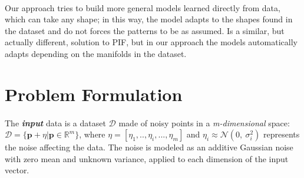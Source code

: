 \paragraph{}
Our approach tries to build more general models learned directly from data, which can take any shape; in this way, the model adapts to the shapes found in the dataset and do not forces the patterns to be as assumed. Is a similar, but actually different, solution to PIF, but in our approach the models automatically adapts depending on the manifolds in the dataset.

\section{Problem Formulation}
\label{sec:problem_formulation}

\paragraph{}
The \textbf{\textit{input}} data is a dataset $\mathcal{D}$ made of noisy points in a \textit{m-dimensional} space: $\mathcal{D} = \{ \textbf{p} + \eta | \textbf{p} \in \mathbb{R}^m \}$, where $\eta = [\eta_1, .., \eta_i, ..., \eta_m]$ and $\eta_i \approx \mathcal{N}(0,\ \sigma^2_i)$ represents the noise affecting the data. The noise is modeled as an additive Gaussian noise with zero mean and unknown variance, applied to each dimension of the input vector.

